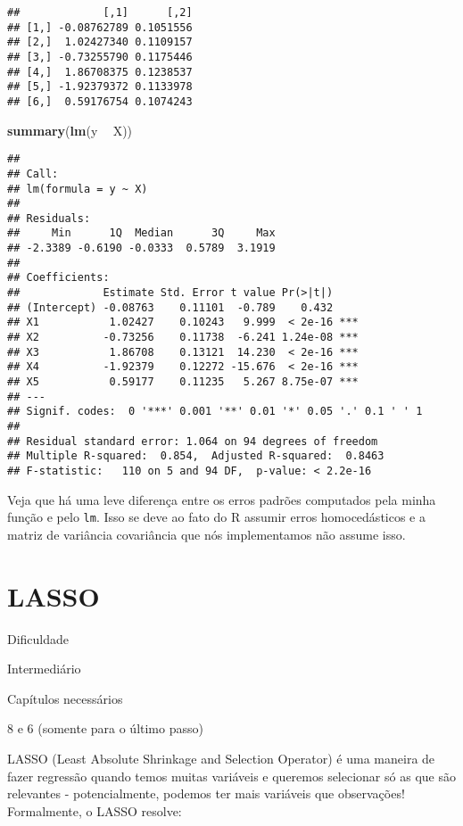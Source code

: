 \documentclass[]{book}
\newenvironment{Shaded}{\begin{snugshade}}{\end{snugshade}}
\newcommand{\KeywordTok}[1]{\textcolor[rgb]{0.13,0.29,0.53}{\textbf{#1}}}
\newcommand{\StringTok}[1]{\textcolor[rgb]{0.31,0.60,0.02}{#1}}
\newcommand{\OperatorTok}[1]{\textcolor[rgb]{0.81,0.36,0.00}{\textbf{#1}}}
\newcommand{\NormalTok}[1]{#1}
\begin{document}
\begin{verbatim}
##             [,1]      [,2]
## [1,] -0.08762789 0.1051556
## [2,]  1.02427340 0.1109157
## [3,] -0.73255790 0.1175446
## [4,]  1.86708375 0.1238537
## [5,] -1.92379372 0.1133978
## [6,]  0.59176754 0.1074243
\end{verbatim}

\begin{Shaded}
\begin{Highlighting}[]
\KeywordTok{summary}\NormalTok{(}\KeywordTok{lm}\NormalTok{(y }\OperatorTok{~}\StringTok{ }\NormalTok{X))}
\end{Highlighting}
\end{Shaded}

\begin{verbatim}
## 
## Call:
## lm(formula = y ~ X)
## 
## Residuals:
##     Min      1Q  Median      3Q     Max 
## -2.3389 -0.6190 -0.0333  0.5789  3.1919 
## 
## Coefficients:
##             Estimate Std. Error t value Pr(>|t|)    
## (Intercept) -0.08763    0.11101  -0.789    0.432    
## X1           1.02427    0.10243   9.999  < 2e-16 ***
## X2          -0.73256    0.11738  -6.241 1.24e-08 ***
## X3           1.86708    0.13121  14.230  < 2e-16 ***
## X4          -1.92379    0.12272 -15.676  < 2e-16 ***
## X5           0.59177    0.11235   5.267 8.75e-07 ***
## ---
## Signif. codes:  0 '***' 0.001 '**' 0.01 '*' 0.05 '.' 0.1 ' ' 1
## 
## Residual standard error: 1.064 on 94 degrees of freedom
## Multiple R-squared:  0.854,  Adjusted R-squared:  0.8463 
## F-statistic:   110 on 5 and 94 DF,  p-value: < 2.2e-16
\end{verbatim}

Veja que há uma leve diferença entre os erros padrões computados pela
minha função e pelo \texttt{lm}. Isso se deve ao fato do R assumir erros
homocedásticos e a matriz de variância covariância que nós implementamos
não assume isso.

\section{LASSO}\label{lasso}

Dificuldade

Intermediário

Capítulos necessários

8 e 6 (somente para o último passo)

LASSO (Least Absolute Shrinkage and Selection Operator) é uma maneira de
fazer regressão quando temos muitas variáveis e queremos selecionar só
as que são relevantes - potencialmente, podemos ter mais variáveis que
observações! Formalmente, o LASSO resolve:
\end{document}

